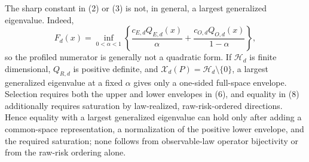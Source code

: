 The sharp constant in (2) or (3) is not, in general, a largest generalized eigenvalue. Indeed,
\[
 F_d(x)=\inf_{0<\alpha<1}\left\{
 \frac{c_{E,d}Q_{E,d}(x)}{\alpha}
 +\frac{c_{O,d}Q_{O,d}(x)}{1-\alpha}\right\}, \tag{9}
\]
so the profiled numerator is generally not a quadratic form. If \(\mathcal H_d\) is finite dimensional, \(Q_{R,d}\) is positive definite, and \(\mathcal X_d(P)=\mathcal H_d\setminus\{0\}\), a largest generalized eigenvalue at a fixed \(\alpha\) gives only a one-sided full-space envelope. Selection requires both the upper and lower envelopes in (6), and equality in (8) additionally requires saturation by law-realized, raw-risk-ordered directions. Hence equality with a largest generalized eigenvalue can hold only after adding a common-space representation, a normalization of the positive lower envelope, and the required saturation; none follows from observable-law operator bijectivity or from the raw-risk ordering alone.